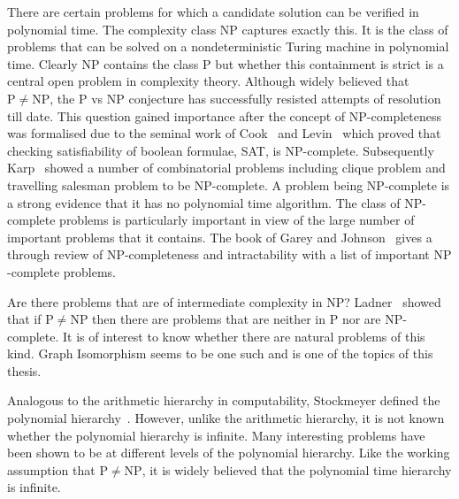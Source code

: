 \documentclass[11pt]{madras}%
\theoremstyle{remark}
\begin{document}
There are certain problems for which a candidate solution can be
verified in polynomial time. The complexity class $\mathrm{NP}$
captures exactly this. It is the class of problems that can be solved
on a nondeterministic Turing machine in polynomial time. Clearly
$\mathrm{NP}$ contains the class $\mathrm{P}$ but whether this
containment is strict is a central open problem in complexity theory.
Although widely believed that $\mathrm{P} \neq \mathrm{NP}$, the
$\mathrm{P}$ vs $\mathrm{NP}$ conjecture has successfully resisted
attempts of resolution till date. This question gained importance
after the concept of $\mathrm{NP}$-completeness was formalised due to
the seminal work of Cook~\cite{cook-sat} and Levin~\cite{levin-np}
which proved that checking satisfiability of boolean formulae, {\small
  SAT}, is $\mathrm{NP}$-complete. Subsequently Karp~\cite{karp-np}
showed a number of combinatorial problems including clique problem and
travelling salesman problem to be $\mathrm{NP}$-complete. A problem
being $\mathrm{NP}$-complete is a strong evidence that it has no
polynomial time algorithm.  The class of $\mathrm{NP}$-complete
problems is particularly important in view of the large number of
important problems that it contains.  The book of Garey and
Johnson~\cite{garey-johnson} gives a through review of
$\mathrm{NP}$-completeness and intractability with a list of important
$\mathrm{NP}$-complete problems.

Are there problems that are of intermediate complexity in
$\mathrm{NP}$?  Ladner~\cite{ladner75ptimereduce} showed that if
$\mathrm{P} \neq \mathrm{NP}$ then there are problems that are neither
in $\mathrm{P}$ nor are $\mathrm{NP}$-complete. It is of interest to
know whether there are natural problems of this kind. Graph
Isomorphism seems to be one such and is one of the topics of this
thesis.

Analogous to the arithmetic hierarchy in computability, Stockmeyer
defined the polynomial hierarchy~\cite{stockmeyer76hierarchy}.
However, unlike the arithmetic hierarchy, it is not known whether the
polynomial hierarchy is infinite. Many interesting problems have been
shown to be at different levels of the polynomial hierarchy. Like the
working assumption that $\mathrm{P} \neq \mathrm{NP}$, it is widely
believed that the polynomial time hierarchy is infinite.

\end{document}
